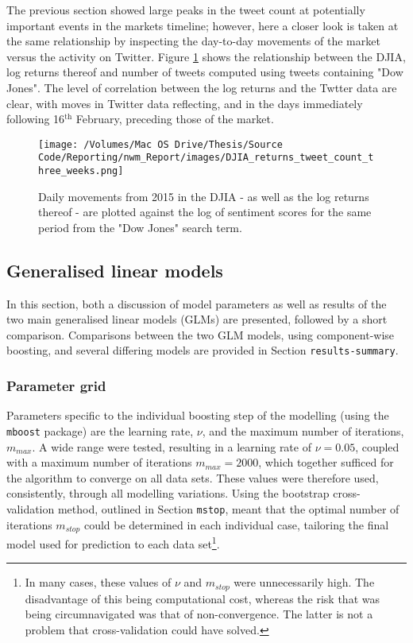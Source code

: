 \documentclass{article}
\begin{document}
The previous section showed large peaks in the tweet count at potentially important events in the markets timeline; however, here a closer look is taken at the same relationship by inspecting the day-to-day movements of the market versus the activity on Twitter. Figure \ref{fig:day-to-day} shows the relationship between the DJIA, log returns thereof and number of tweets computed using tweets containing "Dow Jones". The level of correlation between the log returns and the Twtter data are clear, with moves in Twitter data reflecting, and in the days immediately following 16$^{\text{th}}$ February, preceding those of the market.

\begin{figure}[htb]
\centering
\texttt{[image: /Volumes/Mac OS Drive/Thesis/Source Code/Reporting/nwm\_Report/images/DJIA\_returns\_tweet\_count\_three\_weeks.png]}
\caption[DJIA log-returns plotted alongside the logarithm of tweet counts]{\label{fig:day-to-day}Daily movements from 2015 in the DJIA - as well as the log returns thereof - are plotted against the log of sentiment scores for the same period from the "Dow Jones" search term.}
\end{figure}

\pagebreak


\subsection{Generalised linear models \label{main-modelling}}
\label{sec-1-4}

In this section, both a discussion of model parameters as well as results of the two main generalised linear models (GLMs) are presented, followed by a short comparison. Comparisons between the two GLM models, using component-wise boosting, and several differing models are provided in Section \texttt{results-summary}.


\subsubsection{Parameter grid \label{param-grid}}
\label{sec-1-4-1}

Parameters specific to the individual boosting step of the modelling (using the \texttt{mboost} package) are the learning rate, $\nu$, and the maximum number of iterations, $m_{max}$. A wide range were tested, resulting in a learning rate of $\nu = 0.05$, coupled with a maximum number of iterations $m_{max} = 2000$, which together sufficed for the algorithm to converge on all data sets. These values were therefore used, consistently, through all modelling variations. Using the bootstrap cross-validation method, outlined in Section \texttt{mstop}, meant that the optimal number of iterations $m_{stop}$ could be determined in each individual case, tailoring the final model used for prediction to each data set\footnote{In many cases, these values of $\nu$ and $m_{stop}$ were unnecessarily high. The disadvantage of this being computational cost, whereas the risk that was being circumnavigated was that of non-convergence. The latter is not a problem that cross-validation could have solved.}.
\end{document}

